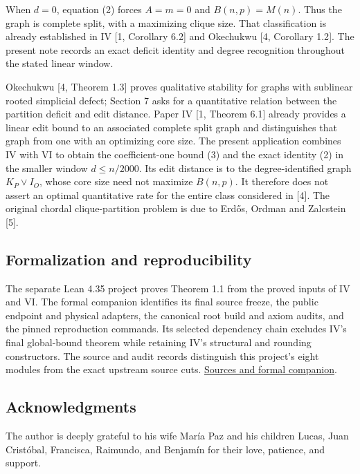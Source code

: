 \documentclass[english,11pt,a4paper]{article}
\begin{document}
When \(d=0\), equation (2) forces \(A=m=0\) and \(B(n,p)=M(n)\). Thus
the graph is complete split, with a maximizing clique size. That
classification is already established in IV {[}1, Corollary 6.2{]} and
Okechukwu {[}4, Corollary 1.2{]}. The present note records an exact
deficit identity and degree recognition throughout the stated linear
window.

Okechukwu {[}4, Theorem 1.3{]} proves qualitative stability for graphs
with sublinear rooted simplicial defect; Section 7 asks for a
quantitative relation between the partition deficit and edit distance.
Paper IV {[}1, Theorem 6.1{]} already provides a linear edit bound to an
associated complete split graph and distinguishes that graph from one
with an optimizing core size. The present application combines IV with
VI to obtain the coefficient-one bound (3) and the exact identity (2) in
the smaller window \(d\le n/2000\). Its edit distance is to the
degree-identified graph \(K_P\vee I_O\), whose core size need not
maximize \(B(n,p)\). It therefore does not assert an optimal
quantitative rate for the entire class considered in {[}4{]}. The
original chordal clique-partition problem is due to Erdős, Ordman and
Zalcstein {[}5{]}.

\subsection{Formalization and
reproducibility}\label{formalization-and-reproducibility}

The separate Lean 4.35 project proves Theorem 1.1 from the proved inputs
of IV and VI. The formal companion identifies its final source freeze,
the public endpoint and physical adapters, the canonical root build and
axiom audits, and the pinned reproduction commands. Its selected
dependency chain excludes IV's final global-bound theorem while
retaining IV's structural and rounding constructors. The source and
audit records distinguish this project's eight modules from the exact
upstream source cuts.
\href{https://github.com/jtraverso/erdos-81-chordal-clique-partitions/tree/main/series_notes/NOTE_II_CHORDAL_STABILITY/05_formalization}{Sources
and formal companion}.

\subsection{Acknowledgments}\label{acknowledgments}

The author is deeply grateful to his wife María Paz and his children
Lucas, Juan Cristóbal, Francisca, Raimundo, and Benjamín for their love,
patience, and support.
\end{document}
